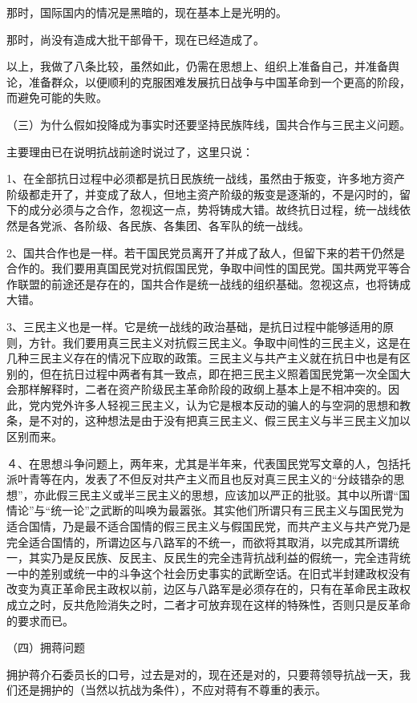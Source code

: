 那时，国际国内的情况是黑暗的，现在基本上是光明的。

那时，尚没有造成大批干部骨干，现在已经造成了。

以上，我做了八条比较，虽然如此，仍需在思想上、组织上准备自己，并准备舆论，准备群众，以便顺利的克服困难发展抗日战争与中国革命到一个更高的阶段，而避免可能的失败。

（三）为什么假如投降成为事实时还要坚持民族阵线，国共合作与三民主义问题。

主要理由已在说明抗战前途时说过了，这里只说：

1、在全部抗日过程中必须都是抗日民族统一战线，虽然由于叛变，许多地方资产阶级都走开了，并变成了敌人，但地主资产阶级的叛变是逐渐的，不是闪时的，留下的成分必须与之合作，忽视这一点，势将铸成大错。故终抗日过程，统一战线依然是各党派、各阶级、各民族、各集团、各军队的统一战线。

2、国共合作也是一样。若干国民党员离开了并成了敌人，但留下来的若干仍然是合作的。我们要用真国民党对抗假国民党，争取中间性的国民党。国共两党平等合作联盟的前途还是存在的，国共合作是统一战线的组织基础。忽视这点，也将铸成大错。

3、三民主义也是一样。它是统一战线的政治基础，是抗日过程中能够适用的原则，方针。我们要用真三民主义对抗假三民主义。争取中间性的三民主义，这是在几种三民主义存在的情况下应取的政策。三民主义与共产主义就在抗日中也是有区别的，但在抗日过程中两者有其一致点，即在把三民主义照着国民党第一次全国大会那样解释时，二者在资产阶级民主革命阶段的政纲上基本上是不相冲突的。因此，党内党外许多人轻视三民主义，认为它是根本反动的骗人的与空洞的思想和教条，是不对的，这种想法是由于没有把真三民主义、假三民主义与半三民主义加以区别而来。

４、在思想斗争问题上，两年来，尤其是半年来，代表国民党写文章的人，包括托派叶青等在内，发表了不但反对共产主义而且也反对真三民主义的“分歧错杂的思想”，亦此假三民主义或半三民主义的思想，应该加以严正的批驳。其中以所谓“国情论”与“统一论”之武断的叫唤为最嚣张。其实他们所谓只有三民主义与国民党为适合国情，乃是最不适合国情的假三民主义与假国民党，而共产主义与共产党乃是完全适合国情的，所谓边区与八路军的不统一，而欲将其取消，以完成其所谓统一，其实乃是反民族、反民主、反民生的完全违背抗战利益的假统一，完全违背统一中的差别或统一中的斗争这个社会历史事实的武断空话。在旧式半封建政权没有改变为真正革命民主政权以前，边区与八路军是必须存在的，只有在革命民主政权成立之时，反共危险消失之时，二者才可放弃现在这样的特殊性，否则只是反革命的要求而已。

（四）拥蒋问题

拥护蒋介石委员长的口号，过去是对的，现在还是对的，只要蒋领导抗战一天，我们还是拥护的（当然以抗战为条件），不应对蒋有不尊重的表示。

